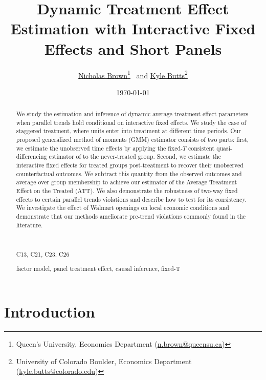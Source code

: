 \documentclass[12pt]{article}
\title{%
    Dynamic Treatment Effect Estimation with Interactive Fixed Effects and Short Panels
}
\author{%
  \href{https://sites.google.com/msu.edu/nicholasbrown}{Nicholas Brown}\thanks{Queen's University, Economics Department (\href{mailto:n.brown@queensu.ca}{n.brown@queensu.ca})}
  \ and 
  \href{https://kylebutts.com/}{Kyle Butts}\thanks{University of Colorado Boulder, Economics Department (\href{mailto:kyle.butts@colorado.edu}{kyle.butts@colorado.edu})}
}
\date{\textsc{\today}}
\newcommand{\nick}[1]{\coauthorComment[Nick]{#1}}
\begin{document}
\maketitle

\begin{abstract}
We study the estimation and inference of dynamic average treatment effect parameters when parallel trends hold conditional on interactive fixed effects. We study the case of staggered treatment, where units enter into treatment at different time periods. Our proposed generalized method of moments (GMM) estimator consists of two parts: first, we estimate the unobserved time effects by applying the fixed-$T$ consistent quasi-differencing estimator of \citet{Ahn_Lee_Schmidt_2013} to the never-treated group. Second, we estimate the interactive fixed effects for treated groups post-treatment to recover their unobserved counterfactual outcomes. We subtract this quantity from the observed outcomes and average over group membership to achieve our estimator of the Average Treatment Effect on the Treated (ATT). We also demonstrate the robustness of two-way fixed effects to certain parallel trends violations and describe how to test for its consistency. We investigate the effect of Walmart openings on local economic conditions and demonstrate that our methods ameliorate pre-trend violations commonly found in the literature.
  
  \par~\par\noindent
   C13, C21, C23, C26
  \par
   factor model, panel treatment effect, causal inference, fixed-T
  \par\vspace{-2.5mm}
\end{abstract}

\newpage


\section{Introduction}

\end{document}
